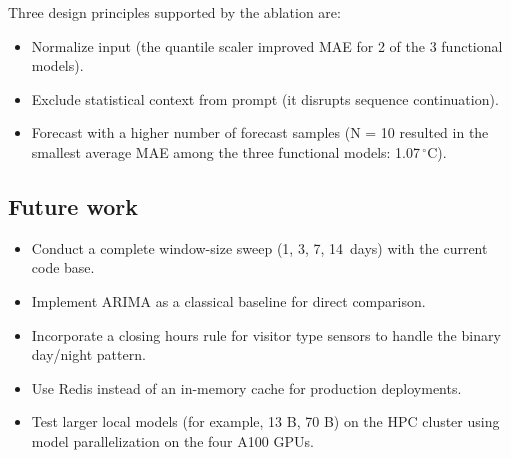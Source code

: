 \documentclass[11pt,a4paper]{article}
\begin{document}
Three design principles supported by the ablation are:
\begin{itemize}[leftmargin=*] 
    \item Normalize input (the quantile scaler improved MAE for 2 of the 3 functional models).
    \item Exclude statistical context from prompt (it disrupts sequence continuation).
    \item Forecast with a higher number of forecast samples (N = 10 resulted in the smallest average MAE among the three functional models: 1.07\,$^{\circ}$C).
\end{itemize}

\subsection{Future work}

\begin{itemize}[leftmargin=*]
    \item Conduct a complete window-size sweep (1, 3, 7, 14~days) with the current code base.
    \item Implement ARIMA as a classical baseline for direct comparison.
    \item Incorporate a closing hours rule for visitor type sensors to handle the binary day/night pattern.
    \item Use Redis instead of an in-memory cache for production deployments.
    \item Test larger local models (for example, 13 B, 70 B) on the HPC cluster using model parallelization on the four A100 GPUs.
\end{itemize}
\end{document}
